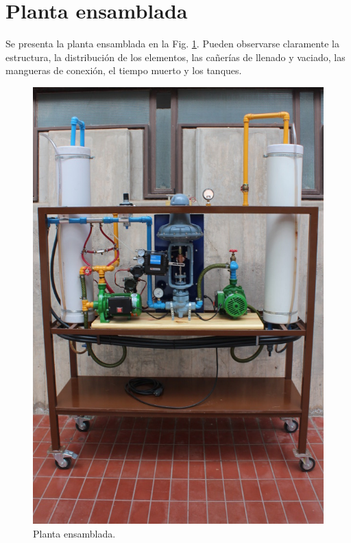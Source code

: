 \section{Planta ensamblada}
Se presenta la planta ensamblada en la Fig. \ref{fig:PlantaEnsamblada}.
Pueden observarse claramente la estructura, la distribución de los elementos,
las cañerías de llenado y vaciado, las mangueras de conexión, el tiempo muerto y
los tanques.
\begin{figure}[h]
	\centering
\includegraphics[width=.64\textwidth]{Cap2-DisenoEnsamblado/images/IMG_5123.JPG}
	\caption{Planta ensamblada.}
	\label{fig:PlantaEnsamblada}
\end{figure}
